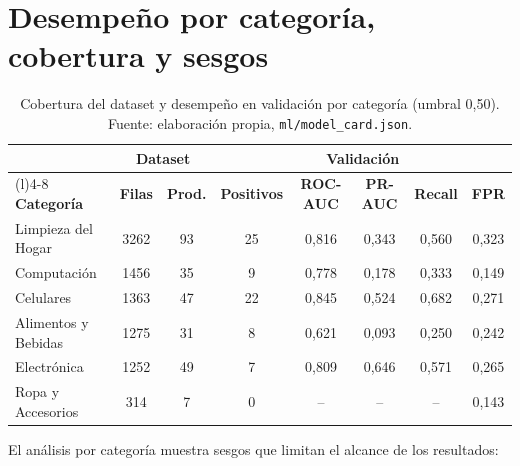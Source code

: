 \section{Desempeño por categoría, cobertura y sesgos}\label{sec:ml-sesgos}

\begin{table}[H]
	\centering
	\small
	\caption{Cobertura del dataset y desempeño en validación por categoría (umbral 0,50). Fuente: elaboración propia, \texttt{ml/model\_card.json}.}
	\label{tab:ml-categorias}
	\begin{tabularx}{\textwidth}{@{}>{\raggedright\arraybackslash}X ccccccc@{}}
		\toprule
		 & \multicolumn{2}{c}{\textbf{Dataset}} & \multicolumn{5}{c}{\textbf{Validación}} \\
		\cmidrule(lr){2-3}\cmidrule(l){4-8}
		\textbf{Categoría} & \textbf{Filas} & \textbf{Prod.} & \textbf{Positivos} & \textbf{ROC-AUC} & \textbf{PR-AUC} & \textbf{Recall} & \textbf{FPR} \\
		\midrule
		Limpieza del Hogar & 3262 & 93 & 25 & 0,816 & 0,343 & 0,560 & 0,323 \\
		Computación & 1456 & 35 & 9 & 0,778 & 0,178 & 0,333 & 0,149 \\
		Celulares & 1363 & 47 & 22 & 0,845 & 0,524 & 0,682 & 0,271 \\
		Alimentos y Bebidas & 1275 & 31 & 8 & 0,621 & 0,093 & 0,250 & 0,242 \\
		Electrónica & 1252 & 49 & 7 & 0,809 & 0,646 & 0,571 & 0,265 \\
		Ropa y Accesorios & 314 & 7 & 0 & -- & -- & -- & 0,143 \\
		\bottomrule
	\end{tabularx}
\end{table}

El análisis por categoría muestra sesgos que limitan el alcance de los resultados:

